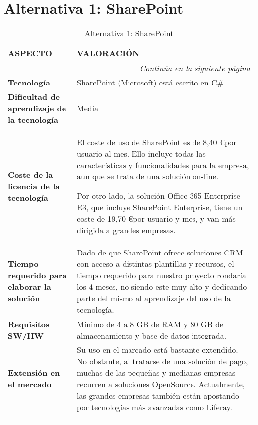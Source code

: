 \section{Alternativa 1: SharePoint}

\begin{center}
\begin{longtable}{p{4cm} p{8cm}}

\textbf{ASPECTO} & \textbf{VALORACIÓN} \\ \hline \hline
\endfirsthead
\endhead

\multicolumn{2}{r}{\textit{Continúa en la siguiente página}} \\
\endfoot
\endlastfoot

\textbf{Tecnología} & SharePoint (Microsoft) está escrito en C\#\\ \hline

\textbf{Dificultad de aprendizaje de la tecnología} & Media\\ \hline

\textbf{Coste de la licencia de la tecnología} &
\par El coste de uso de SharePoint es de 8,40 \euro por usuario al mes. Ello incluye todas las características y funcionalidades para la empresa, aun que se trata de una solución on-line.
\par Por otro lado, la solución Office 365 Enterprise E3, que incluye SharePoint Enterprise, tiene un coste de 19,70 \euro por usuario y mes, y van más dirigida a grandes empresas.
\\ \hline

\textbf{Tiempo requerido para elaborar la solución} & Dado de que SharePoint ofrece soluciones CRM con acceso a distintas plantillas y recursos, el tiempo requerido para nuestro proyecto rondaría los 4 meses, no siendo este muy alto y dedicando parte del mismo al aprendizaje del uso de la tecnología.\\ \hline

\textbf{Requisitos SW/HW} & Mínimo de 4 a 8 GB de RAM y 80 GB de almacenamiento y base de datos integrada.\\ \hline

\textbf{Extensión en el mercado} & Su uso en el marcado está bastante extendido. No obstante, al tratarse de una solución de pago, muchas de las pequeñas y medianas empresas recurren a soluciones OpenSource. Actualmente, las grandes empresas también están apostando por tecnologías más avanzadas como Liferay.\\ \hline \hline


\caption{Alternativa 1: SharePoint}\\
\label{tab:alternative1}
\end{longtable}
\end{center}
